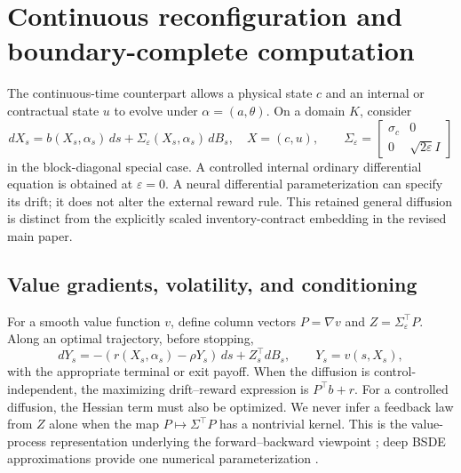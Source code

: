 \section{Continuous reconfiguration and boundary-complete computation}\label{sec:continuous}
The continuous-time counterpart allows a physical state $c$ and an internal or contractual state $u$ to evolve under $\alpha=(a,\theta)$. On a domain $K$, consider
\begin{equation}\label{eq:sde}
 dX_s=b(X_s,\alpha_s)\,ds+\Sigma_\varepsilon(X_s,\alpha_s)\,dB_s,
 \quad X=(c,u),\qquad
 \Sigma_\varepsilon=\begin{bmatrix}\sigma_c&0\\0&\sqrt{2\varepsilon}I\end{bmatrix}
\end{equation}
in the block-diagonal special case. A controlled internal ordinary differential equation is obtained at $\varepsilon=0$. A neural differential parameterization can specify its drift; it does not alter the external reward rule. This retained general diffusion is distinct from the explicitly scaled inventory-contract embedding in the revised main paper.

\subsection{Value gradients, volatility, and conditioning}
For a smooth value function $v$, define column vectors $P=\nabla v$ and $Z=\Sigma_\varepsilon^\top P$. Along an optimal trajectory, before stopping,
\begin{equation}\label{eq:bsde}
 dY_s=-(r(X_s,\alpha_s)-\rho Y_s)\,ds+Z_s^\top dB_s,
 \qquad Y_s=v(s,X_s),
\end{equation}
with the appropriate terminal or exit payoff. When the diffusion is control-independent, the maximizing drift--reward expression is $P^\top b+r$. For a controlled diffusion, the Hessian term must also be optimized. We never infer a feedback law from $Z$ alone when the map $P\mapsto\Sigma^\top P$ has a nontrivial kernel. This is the value-process representation underlying the forward--backward viewpoint \citep{MaProtterYong1994}; deep BSDE approximations provide one numerical parameterization \citep{HanJentzenE2018}.

